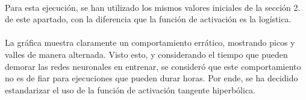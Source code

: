 \documentclass[12pt, twocolumn]{article}
\begin{document}
	\paragraph{} Para esta ejecución, se han utilizado los mismos valores iniciales de la sección 2. de este apartado, con la diferencia que la función de activación es la logística. 
	
	\paragraph{} La gráfica muestra claramente un comportamiento errático, mostrando picos y valles de manera alternada. Visto esto, y considerando el tiempo que pueden demorar las redes neuronales en entrenar, se consideró que este comportamiento no es de fiar para ejecuciones que pueden durar horas. Por ende, se ha decidido estandarizar el uso de la función de activación tangente hiperbólica. 
	
	
	
	
	
	
	
	
	
\end{document}
